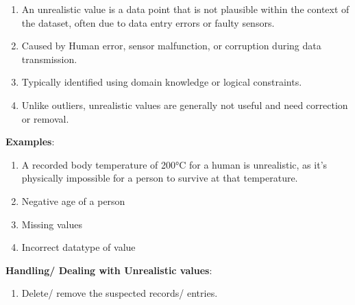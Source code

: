 \begin{enumerate}
    \item An unrealistic value is a data point that is not plausible within the context of the dataset, often due to data entry errors or faulty sensors. \hfill \cite{common/online/chatgpt}

    \item Caused by Human error, sensor malfunction, or corruption during data transmission. \hfill \cite{common/online/chatgpt}

    \item Typically identified using domain knowledge or logical constraints. \hfill \cite{common/online/chatgpt}

    \item Unlike outliers, unrealistic values are generally not useful and need correction or removal. \hfill \cite{common/online/chatgpt}

\end{enumerate}

\vspace{0.3cm}

\textbf{Examples}:
\begin{enumerate}
    \item A recorded body temperature of 200°C for a human is unrealistic, as it’s physically impossible for a person to survive at that temperature. \hfill \cite{common/online/chatgpt}

    \item Negative age of a person \hfill \cite{common/online/chatgpt}

    \item Missing values \hfill \cite{statistics/book/Statistics-for-Data-Scientists/Maurits-Kaptein}

    \item Incorrect datatype of value \hfill \cite{statistics/book/Statistics-for-Data-Scientists/Maurits-Kaptein}
\end{enumerate}

\vspace{0.3cm}
\textbf{Handling/ Dealing with Unrealistic values}:
\begin{enumerate}
    \item Delete/ remove the suspected records/ entries. \hfill \cite{statistics/book/Statistics-for-Data-Scientists/Maurits-Kaptein}
    
\end{enumerate}





